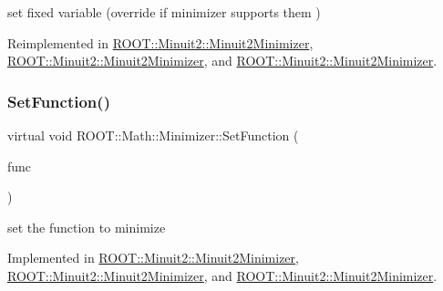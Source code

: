 set fixed variable (override if minimizer supports them ) 



Reimplemented in \mbox{\hyperlink{classROOT_1_1Minuit2_1_1Minuit2Minimizer_af42341b80ebb02d8c0882beaa781e7bd}{R\+O\+O\+T\+::\+Minuit2\+::\+Minuit2\+Minimizer}}, \mbox{\hyperlink{classROOT_1_1Minuit2_1_1Minuit2Minimizer_af42341b80ebb02d8c0882beaa781e7bd}{R\+O\+O\+T\+::\+Minuit2\+::\+Minuit2\+Minimizer}}, and \mbox{\hyperlink{classROOT_1_1Minuit2_1_1Minuit2Minimizer_af42341b80ebb02d8c0882beaa781e7bd}{R\+O\+O\+T\+::\+Minuit2\+::\+Minuit2\+Minimizer}}.

\mbox{\label{classROOT_1_1Math_1_1Minimizer_a4391c613ab0c3f9777e56b487ffa5eac}} 
\subsubsection{\texorpdfstring{SetFunction()}{SetFunction()}\hspace{0.1cm}{\footnotesize\ttfamily [1/6]}}
{\footnotesize\ttfamily virtual void R\+O\+O\+T\+::\+Math\+::\+Minimizer\+::\+Set\+Function (\begin{DoxyParamCaption}\item[{const \mbox{\hyperlink{namespaceROOT_1_1Math_aec22897f3d759f7c284893c81d980799}{R\+O\+O\+T\+::\+Math\+::\+I\+Multi\+Gen\+Function}} \&}]{func }\end{DoxyParamCaption})\hspace{0.3cm}{\ttfamily [pure virtual]}}



set the function to minimize 



Implemented in \mbox{\hyperlink{classROOT_1_1Minuit2_1_1Minuit2Minimizer_ae18efc66a943fe11b1114ff8c1b28ad0}{R\+O\+O\+T\+::\+Minuit2\+::\+Minuit2\+Minimizer}}, \mbox{\hyperlink{classROOT_1_1Minuit2_1_1Minuit2Minimizer_ae18efc66a943fe11b1114ff8c1b28ad0}{R\+O\+O\+T\+::\+Minuit2\+::\+Minuit2\+Minimizer}}, and \mbox{\hyperlink{classROOT_1_1Minuit2_1_1Minuit2Minimizer_ae18efc66a943fe11b1114ff8c1b28ad0}{R\+O\+O\+T\+::\+Minuit2\+::\+Minuit2\+Minimizer}}.

